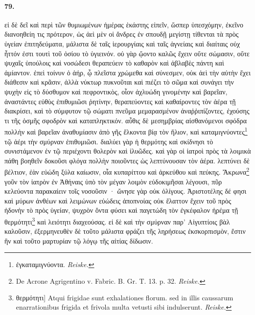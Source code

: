 \documentclass[a4paper, 11pt, oneside, polutonikogreek, german, landscape]{article}
\begin{document}
\paragraph{79.}
εἰ δὲ δεῖ καὶ περὶ τῶν θυμιωμένων ἡμέρας ἑκάστης εἰπεῖν, ὥσπερ ὑπεσχόμην, ἐκεῖνο διανοηθείη τις πρότερον, ὡς ἀεὶ μὲν οἱ ἄνδρες ἐν σπουδῇ μεγίστῃ τίθενται τὰ πρὸς ὑγείαν ἐπιτηδεύματα, μάλιστα δὲ ταῖς ἱερουργίαις καὶ ταῖς ἁγνείαις καὶ διαίταις οὐχ ἧττόν ἐστι τουτὶ τοῦ ὁσίου τὸ ὑγιεινόν. οὐ γὰρ ᾤοντο καλῶς ἔχειν οὔτε σώμασιν, οὔτε ψυχαῖς ὑπούλοις καὶ νοσώδεσι θεραπεύειν τὸ καθαρὸν καὶ ἀβλαβὲς πάντη καὶ ἀμίαντον. ἐπεὶ τοίνυν ὁ ἀήρ, ᾧ πλεῖστα χρώμεθα καὶ σύνεσμεν, οὐκ ἀεὶ τὴν αὐτὴν ἔχει διάθεσιν καὶ κρᾶσιν, ἀλλὰ νύκτωρ πυκνοῦται καὶ πιέζει τὸ σῶμα καὶ συνάγει τὴν ψυχὴν εἰς τὸ δύσθυμον καὶ πεφροντικὸς, οἷον ἀχλυώδη γινομένην καὶ βαρεῖαν, ἀναστάντες εὐθὺς ἐπιθυμιῶσι ῥητίνην, θεραπεύοντες καὶ καθαίροντες τὸν ἀέρα τῇ διακρίσει, καὶ τὸ σύμφυτον τῷ σώματι πνεῦμα μεμαρασμένον ἀναῤῥιπίζοντες, ἐχούσης τι τῆς ὀσμῆς σφοδρὸν καὶ καταπληκτικόν. αὖθις δὲ μεσημβρίας αἰσθανόμενοι σφόδρα πολλὴν καὶ βαρεῖαν ἀναθυμίασιν ἀπὸ γῆς ἕλκοντα βίᾳ τὸν ἥλιον, καὶ καταμιγνύοντες\footnote{ἐγκαταμιγνύοντα. \emph{Reiske.}} τῷ ἀέρι τὴν σμύρναν ἐπιθυμιῶσι. διαλύει γὰρ ἡ θερμότης καὶ σκίδνησι τὸ συνιστάμενον ἐν τῷ περιέχοντι θολερὸν καὶ ἰλυῶδες. καὶ γὰρ οἱ ἰατροὶ πρὸς τὰ λοιμικὰ πάθη βοηθεῖν δοκοῦσι φλόγα πολλὴν ποιοῦντες ὡς λεπτύνουσαν τὸν ἀέρα. λεπτύνει δὲ βέλτιον, ἐὰν εὐώδη ξύλα καίωσιν, οἷα κυπαρίττου καὶ ἀρκεύθου καὶ πεύκης. Ἄκρωνα\footnote{De Acrone Agrigentino v. Fabric. B. Gr. T. 13. p. 32. \emph{Reiske.}} γοῦν τὸν ἰατρὸν ἐν Ἀθήναις ὑπὸ τὸν μέγαν λοιμὸν εὐδοκιμῆσαι λέγουσι, πῦρ κελεύοντα παρακαίειν τοῖς νοσοῦσιν · ὤνησε γὰρ οὐκ ὀλίγους. Ἀριστοτέλης δέ φησι καὶ μύρων ἀνθέων καὶ λειμώνων εὐώδεις ἀποπνοίας οὐκ ἔλαττον ἔχειν τοῦ πρὸς ἡδονὴν τὸ πρὸς ὑγείαν, ψυχρὸν ὄντα φύσει καὶ παγετώδη τὸν ἐγκέφαλον ἠρέμα τῇ θερμότητι\footnote{θερμότητι] Atqui frigidae sunt exhalationes florum. sed in illis caussarum enarrationibus frigida et frivola multa vetusti sibi indulserunt. \emph{Reiske.}} καὶ λειότητι διαχεούσας. εἰ δὲ καὶ τὴν σμύρναν παρ' Αἰγυπτίοις βὰλ καλοῦσιν, ἐξερμηνευθὲν δὲ τοῦτο μάλιστα φράζει τῆς ληρήσεως ἐκσκορπισμὸν, ἔστιν ἣν καὶ τοῦτο μαρτυρίαν τῷ λόγῳ τῆς αἰτίας δίδωσιν.
\end{document}
